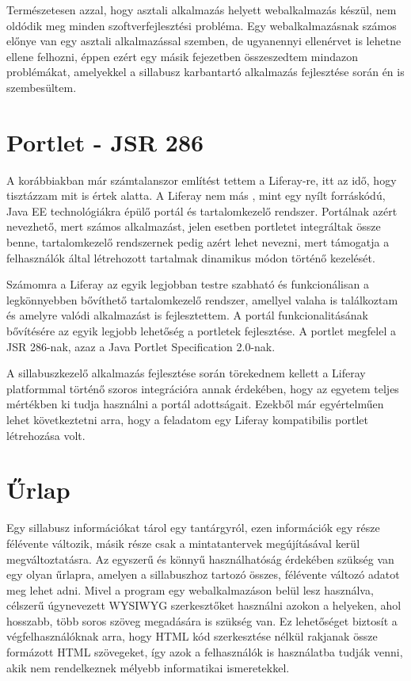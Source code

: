 \documentclass[hidelinks, 12pt, a4paper]{report}
\begin{document}
Természetesen azzal, hogy asztali alkalmazás helyett webalkalmazás készül, nem oldódik meg minden szoftverfejlesztési probléma. Egy webalkalmazásnak számos előnye van egy asztali alkalmazással szemben, de ugyanennyi ellenérvet is lehetne ellene felhozni, éppen ezért egy másik fejezetben összeszedtem mindazon problémákat, amelyekkel a sillabusz karbantartó alkalmazás fejlesztése során én is szembesültem.

\section{Portlet - JSR 286}

A korábbiakban már számtalanszor említést tettem a Liferay-re, itt az idő, hogy tisztázzam mit is értek alatta. A Liferay nem más \cite{liferay-in-action}, mint egy nyílt forráskódú, Java EE technológiákra épülő portál és tartalomkezelő rendszer. Portálnak azért nevezhető, mert számos alkalmazást, jelen esetben portletet integráltak össze benne, tartalomkezelő rendszernek pedig azért lehet nevezni, mert támogatja a felhasználók által létrehozott tartalmak dinamikus módon történő kezelését.

Számomra a Liferay az egyik legjobban testre szabható és funkcionálisan a legkönnyebben bővíthető tartalomkezelő rendszer, amellyel valaha is találkoztam és amelyre valódi alkalmazást is fejlesztettem. A portál funkcionalitásának bővítésére az egyik legjobb lehetőség a portletek fejlesztése. A portlet \cite{jsr286} megfelel a JSR 286-nak, azaz a Java Portlet Specification 2.0-nak.

A sillabuszkezelő alkalmazás fejlesztése során törekednem kellett a Liferay platformmal történő szoros integrációra annak érdekében, hogy az egyetem teljes mértékben ki tudja használni a portál adottságait. Ezekből már egyértelműen lehet következtetni arra, hogy a feladatom egy Liferay kompatibilis portlet létrehozása volt.

\section{Űrlap}

Egy sillabusz információkat tárol egy tantárgyról, ezen információk egy része félévente változik, másik része csak a mintatantervek megújításával kerül megváltoztatásra. Az egyszerű és könnyű használhatóság érdekében szükség van egy olyan űrlapra, amelyen a sillabuszhoz tartozó összes, félévente változó adatot meg lehet adni. Mivel a program egy webalkalmazáson belül lesz használva, célszerű úgynevezett \mbox{WYSIWYG}\footnotemark{} szerkesztőket használni azokon a helyeken, ahol hosszabb, több soros szöveg megadására is szükség van. Ez lehetőséget biztosít a végfelhasználóknak arra, hogy HTML kód szerkesztése nélkül rakjanak össze formázott HTML szövegeket, így azok a felhasználók is használatba tudják venni, akik nem rendelkeznek mélyebb informatikai ismeretekkel.
\end{document}
